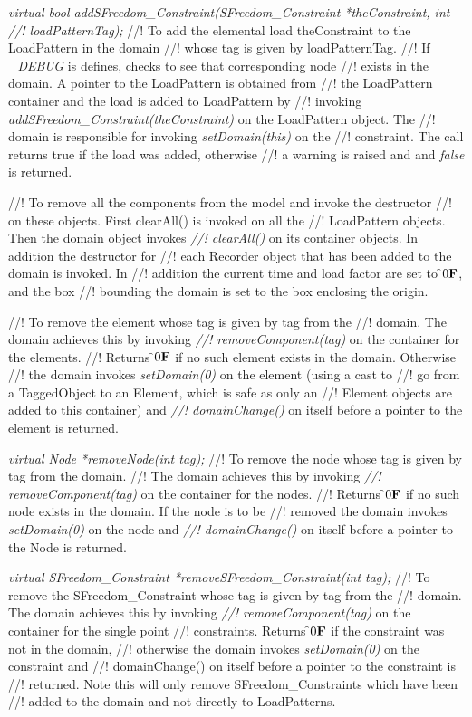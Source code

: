 {\em virtual bool addSFreedom\_Constraint(SFreedom\_Constraint *theConstraint, int
//! loadPatternTag);}    
//! To add the elemental load \p theConstraint to the LoadPattern in the domain
//! whose tag is given by \p loadPatternTag.
//! If {\em \_DEBUG} is defines, checks to see that corresponding node
//! exists in the domain. A pointer to the LoadPattern is obtained from
//! the LoadPattern container and the load is added to LoadPattern by
//! invoking {\em addSFreedom\_Constraint(theConstraint)} on the LoadPattern object. The
//! domain is responsible for invoking {\em setDomain(this)} on the
//! constraint. The call returns \p true if the load was added, otherwise
//! a warning is raised and and {\em false} is returned. 


//! To remove all the components from the model and invoke the destructor
//! on these objects. First clearAll() is invoked on all the
//! LoadPattern objects. Then the domain object invokes {\em
//! clearAll()} on its container objects. In addition the destructor for
//! each Recorder object that has been added to the domain is invoked. In
//! addition the current time and load factor are set to \f$0{\bf F}$, and the box
//! bounding the domain is set to the box enclosing the origin. 


//! To remove the element whose tag is given by \p tag from the
//! domain. The domain achieves this by invoking {\em
//! removeComponent(tag)} on the container for the elements. 
//! Returns \f$0{\bf F}$ if no such element exists in the domain. Otherwise 
//! the domain invokes {\em setDomain(0)} on the element (using a cast to
//! go from a TaggedObject to an Element, which is safe as only an
//! Element objects are added to this container) and {\em
//! domainChange()} on itself before a pointer to the element is returned. 

{\em virtual Node *removeNode(int tag);}    
//! To remove the node whose tag is given by \p tag from the domain. 
//! The domain achieves this by invoking {\em
//! removeComponent(tag)} on the container for the nodes. 
//! Returns \f$0{\bf F}$ if no such node exists in the domain. If the node is to be
//! removed the domain invokes {\em setDomain(0)} on the node and {\em
//! domainChange()} on itself before a pointer to the Node is returned. 

{\em virtual SFreedom\_Constraint *removeSFreedom\_Constraint(int tag);}
//! To remove the SFreedom\_Constraint whose tag is given by \p tag from the
//! domain. The domain achieves this by invoking {\em
//! removeComponent(tag)} on the container for the single point
//! constraints. Returns \f$0{\bf F}$ if the constraint was not in the domain,
//! otherwise the domain invokes {\em setDomain(0)} on the constraint and
//! domainChange() on itself before a pointer to the constraint is
//! returned. Note this will only remove SFreedom\_Constraints which have been
//! added to the domain and not directly to LoadPatterns.

